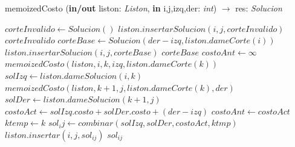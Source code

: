 \begin{algorithm}
\caption{memoizedCosto (\textbf{in/out} liston: \textsl{Liston}, \textbf{in} i,j,izq,der: \textsl{int}) $\rightarrow$ res: \textsl{Solucion}}
\begin{algorithmic}[1]

		\STATE $corteInvalido \leftarrow Solucion()$
		\STATE $liston.insertarSolucion(i,j,corteInvalido)$
		\RETURN $corteInvalido$
	\ELSE
		\STATE $corteBase \leftarrow Solucion(der-izq, liston.dameCorte(i))$
		\STATE $liston.insertarSolucion(i,j,corteBase)$
		\RETURN $corteBase$
	\ENDIF
\ELSE
	\STATE $costoAnt \leftarrow \infty$
			\STATE $memoizedCosto(liston,i,k,izq,liston.dameCorte(k))$
		\ENDIF
		\STATE $solIzq \leftarrow liston.dameSolucion(i,k)$
			\STATE $memoizedCosto(liston,k+1,j,liston.dameCorte(k),der)$
		\ENDIF
		\STATE $solDer \leftarrow liston.dameSolucion(k+1,j)$
		\STATE $costoAct \leftarrow solIzq.costo + solDer.costo + (der-izq)$
			\STATE $costoAnt \leftarrow costoAct$
			\STATE $ktemp \leftarrow k$
			\STATE $sol_ij \leftarrow combinar(solIzq,solDer,costoAct,ktmp)$
		\ENDIF
	\ENDFOR
	\STATE $liston.insertar(i,j,sol_{ij})$
	\RETURN $sol_{ij}$
\ENDIF
\end{algorithmic}
\end{algorithm}

